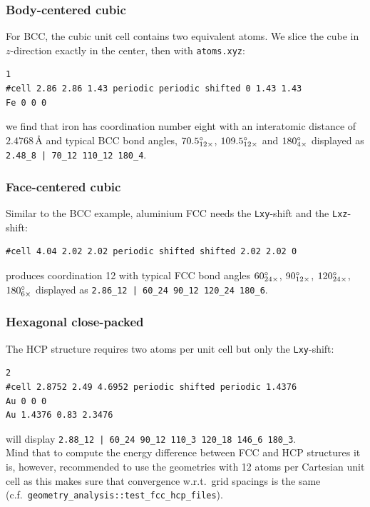 \documentclass[oribibl]{llncs}
\newcommand{\ttt}[1]{\texttt{#1}}
\begin{document}
\subsubsection{Body-centered cubic}
For BCC, the cubic unit cell contains two equivalent atoms.
We slice the cube in $z$-direction exactly in the center, then with \ttt{atoms.xyz}:
\begin{verbatim}
1
#cell 2.86 2.86 1.43 periodic periodic shifted 0 1.43 1.43
Fe 0 0 0
\end{verbatim}
we find that iron has coordination number eight with an interatomic distance of $2.4768\,$\AA{} and typical BCC bond angles,
$70.5\degree_{12\times}$, $109.5\degree_{12\times}$ and $180\degree_{4\times}$
displayed as \ttt{2.48\_8 |  70\_12 110\_12 180\_4}.

%
\subsubsection{Face-centered cubic}
Similar to the BCC example, aluminium FCC needs the \ttt{Lxy}-shift and the \ttt{Lxz}-shift:
\begin{verbatim}
#cell 4.04 2.02 2.02 periodic shifted shifted 2.02 2.02 0
\end{verbatim}
produces coordination 12 with typical FCC bond angles
$60\degree_{24\times}$, $90\degree_{12\times}$, $120\degree_{24\times}$, $180\degree_{6\times}$ displayed as
\ttt{2.86\_12 |  60\_24 90\_12 120\_24 180\_6}.

%
\subsubsection{Hexagonal close-packed}
The HCP structure requires two atoms per unit cell but only the \ttt{Lxy}-shift:
\begin{verbatim}
2
#cell 2.8752 2.49 4.6952 periodic shifted periodic 1.4376
Au 0 0 0
Au 1.4376 0.83 2.3476
\end{verbatim}
will display \ttt{2.88\_12 |  60\_24 90\_12 110\_3 120\_18 146\_6 180\_3}.\\
Mind that to compute the energy difference between FCC and HCP structures it is, however,
recommended to use the geometries with 12 atoms per Cartesian unit cell
as this makes sure that convergence w.r.t.~grid spacings is the same
(c.f.~\ttt{geometry\_analysis::test\_fcc\_hcp\_files}).
\end{document}
